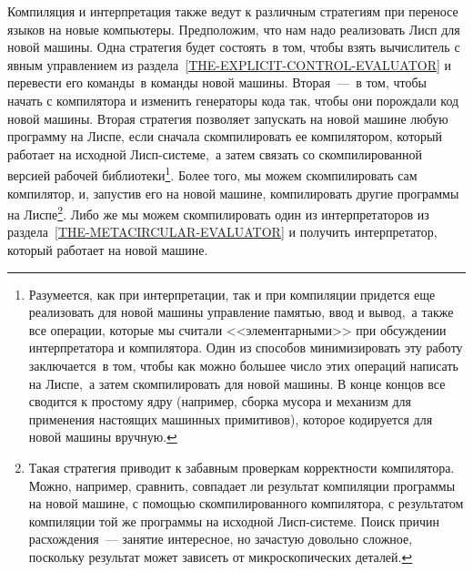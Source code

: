 Компиляция и интерпретация также ведут к различным
стратегиям при 
переносе языков на новые компьютеры.  Предположим, что
нам надо реализовать Лисп для новой машины.  Одна стратегия будет
состоять~в том, чтобы взять вычислитель с явным управлением из 
раздела~\ref{THE-EXPLICIT-CONTROL-EVALUATOR} и перевести его
команды~в команды новой машины.  Вторая~---~в том, чтобы
начать с компилятора и изменить генераторы кода так, чтобы они
порождали код новой машины.  Вторая стратегия позволяет запускать
на новой машине любую программу на Лиспе, если сначала скомпилировать ее
компилятором, который работает на исходной Лисп-системе,~а затем
связать со скомпилированной версией рабочей библиотеки\footnote{Разумеется, как при интерпретации, так и при
компиляции придется еще реализовать для новой машины управление
памятью, ввод и вывод,~а также все операции, которые мы считали
<<элементарными>> при обсуждении интерпретатора и компилятора.  Один
из способов минимизировать эту работу заключается~в том, чтобы как
можно большее число этих операций написать на Лиспе,~а затем
скомпилировать для новой машины.  В конце концов все сводится к
простому ядру (например, сборка мусора и механизм для применения
настоящих машинных примитивов), которое кодируется для новой машины
вручную.
}.
Более того, мы можем скомпилировать сам компилятор, и, запустив
его на новой машине, компилировать другие программы на
Лиспе\footnote{Такая стратегия приводит к забавным проверкам
корректности компилятора.  Можно, например, сравнить, совпадает ли
результат компиляции программы на новой машине, с помощью
скомпилированного компилятора, с результатом компиляции той же
программы на исходной Лисп-системе.  Поиск причин расхождения~---
занятие интересное, но зачастую довольно сложное, поскольку результат
может зависеть от микроскопических деталей.
}.
Либо же мы можем скомпилировать один из интерпретаторов из 
раздела~\ref{THE-METACIRCULAR-EVALUATOR} и получить интерпретатор,
который работает на новой машине.
